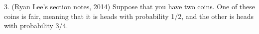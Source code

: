 \documentclass{article}
\begin{document}


    
    



3. (Ryan Lee's section notes, 2014) Suppose that you have two coins. One of these coins is fair, meaning that it is heads with probability 1/2, and the other is heads with probability 3/4.
\end{document}

